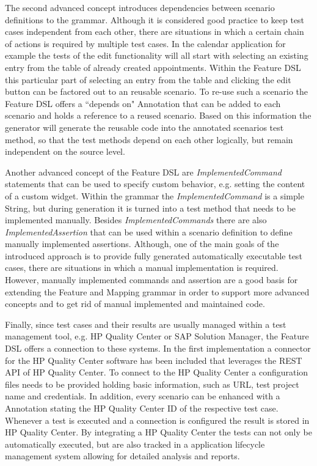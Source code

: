 \documentclass{sig-alternate-05-2015}
\begin{document}
{The second advanced concept introduces dependencies between scenario definitions to the grammar.
Although it is considered good practice to keep test cases independent from each other, there are situations in which a certain chain of actions is required by multiple test cases.
In the calendar application for example the tests of the edit functionality will all start with selecting an existing entry from the table of already created appointments.
Within the Feature DSL this particular part of selecting an entry from the table and clicking the edit button can be factored out to an reusable scenario.
To re-use such a scenario the Feature DSL offers a ``depends on" Annotation that can be added to each scenario and holds a reference to a reused scenario.
Based on this information the generator will generate the reusable code into the annotated scenarios test method, so that the test methods depend on each other logically, but remain independent on the source level.

Another advanced concept of the Feature DSL are \textit{ImplementedCommand} statements that can be used to specify custom behavior, e.g. setting the content of a custom widget.
Within the grammar the \textit{ImplementedCommand} is a simple String, but during generation it is turned into a test method that needs to be implemented manually. 
Besides \textit{ImplementedCommands} there are also  \textit{ImplementedAssertion} that can be used within a scenario definition to define manually implemented assertions.
Although, one of the main goals of the introduced approach is to provide fully generated automatically executable test cases, there are situations in which a manual implementation is required. 
However, manually implemented commands and assertion are a good basis for extending the Feature and Mapping grammar in order to support more advanced concepts and to get rid of manual implemented and maintained code.

Finally, since test cases and their results are usually managed within a test management tool, e.g. HP Quality Center or SAP Solution Manager, the Feature DSL offers a connection to these systems.
In the first implementation a connector for the HP Quality Center software has been included that leverages the REST API of HP Quality Center.
To connect to the HP Quality Center a configuration files needs to be provided holding basic information, such as URL, test project name and credentials.
In addition, every scenario can be enhanced with a Annotation stating the HP Quality Center ID of the respective test case.
Whenever a test is executed and a connection is configured the result is stored in HP Quality Center.
By integrating a HP Quality Center the tests can not only be automatically executed, but are also tracked in a application lifecycle management system allowing for detailed analysis and reports.


}
\end{document}
